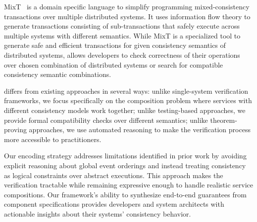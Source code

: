 MixT~\cite{mixt} is a domain specific language to simplify
programming mixed-consistency transactions over multiple
distributed systems. It uses information flow theory to
generate transactions consisting of sub-transactions
that safely execute across multiple systems with different
semantics. While MixT is a specialized tool to generate
safe and efficient transactions for given consistency semantics
of distributed systems, \sysname{} allows developers to check
correctness of their operations over chosen combination of
distributed systems or search for compatible consistency
semantic combinations.

\sysname{} differs from existing approaches in several ways:
unlike single-system verification frameworks,
we focus specifically on the composition problem where services with
different consistency models work together; unlike testing-based
approaches, we provide formal compatibility checks over different semantics;
unlike theorem-proving approaches, we use automated reasoning to make
the verification process more accessible to practitioners.

Our encoding strategy addresses limitations identified in prior work
by avoiding explicit reasoning about global event orderings and
instead treating consistency as logical constraints over abstract
executions. This approach makes the verification tractable
while remaining expressive enough to handle realistic service
compositions. Our framework's ability to synthesize end-to-end
guarantees from component specifications provides developers and
system architects with actionable insights about their systems'
consistency behavior.

\vspace{-0.125cm}


